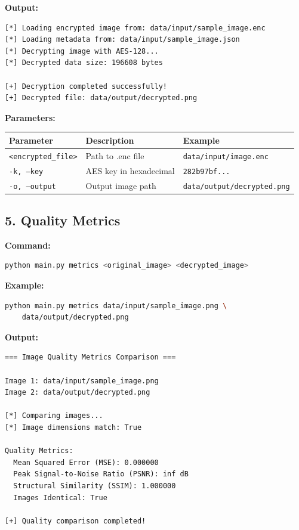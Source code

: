 \documentclass[12pt,a4paper]{report}
\begin{document}
\textbf{Output:}
\begin{lstlisting}
[*] Loading encrypted image from: data/input/sample_image.enc
[*] Loading metadata from: data/input/sample_image.json
[*] Decrypting image with AES-128...
[*] Decrypted data size: 196608 bytes

[+] Decryption completed successfully!
[+] Decrypted file: data/output/decrypted.png
\end{lstlisting}

\textbf{Parameters:}
\begin{table}[H]
    \centering
    \begin{tabular}{|l|l|l|}
    \hline
    \textbf{Parameter} & \textbf{Description} & \textbf{Example} \\
    \hline
    \texttt{<encrypted\_file>} & Path to .enc file & \texttt{data/input/image.enc} \\
    \texttt{-k, --key} & AES key in hexadecimal & \texttt{282b97bf...} \\
    \texttt{-o, --output} & Output image path & \texttt{data/output/decrypted.png} \\
    \hline
    \end{tabular}
\end{table}

\subsection{5. Quality Metrics}

\textbf{Command:}
\begin{lstlisting}[language=bash]
python main.py metrics <original_image> <decrypted_image>
\end{lstlisting}

\textbf{Example:}
\begin{lstlisting}[language=bash]
python main.py metrics data/input/sample_image.png \
    data/output/decrypted.png
\end{lstlisting}

\textbf{Output:}
\begin{lstlisting}
=== Image Quality Metrics Comparison ===

Image 1: data/input/sample_image.png
Image 2: data/output/decrypted.png

[*] Comparing images...
[*] Image dimensions match: True

Quality Metrics:
  Mean Squared Error (MSE): 0.000000
  Peak Signal-to-Noise Ratio (PSNR): inf dB
  Structural Similarity (SSIM): 1.000000
  Images Identical: True

[+] Quality comparison completed!
\end{lstlisting}
\end{document}

